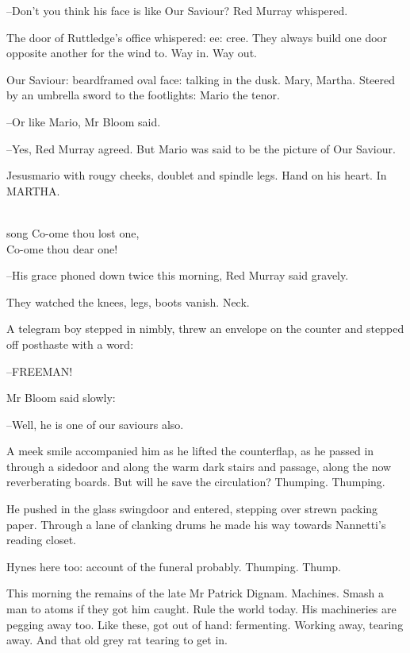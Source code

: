--Don't you think his face is like Our Saviour?
Red Murray whispered.

The door of Ruttledge's office whispered: ee: cree.
They always build one door opposite another for the wind to.
Way in.
Way out.

Our Saviour:
beardframed oval face:
talking in the dusk.
Mary, Martha.
Steered by an umbrella sword to the footlights:
Mario the tenor.

--Or like Mario,
Mr Bloom said.

--Yes,
Red Murray agreed.
But Mario was said to be the picture of Our Saviour.

Jesusmario with rougy cheeks, doublet and spindle legs.
Hand on his heart.
In MARTHA.


\\song{%
    Co-ome thou lost one,\\
    Co-ome thou dear one!}



--His grace phoned down twice this morning,
Red Murray said gravely.

They watched the knees, legs, boots vanish.
Neck.

A telegram boy stepped in nimbly,
threw an envelope on the counter
and stepped off posthaste with a word:

--FREEMAN!

Mr Bloom said slowly:

--Well, he is one of our saviours also.

A meek smile accompanied him
as he lifted the counterflap,
as he passed in through a sidedoor
and along the warm dark stairs and passage,
along the now reverberating boards.
But will he save the circulation?
Thumping.
Thumping.

He pushed in the glass swingdoor and entered,
stepping over strewn packing paper.
Through a lane of clanking drums
he made his way towards Nannetti's reading closet.

Hynes here too:
account of the funeral probably.
Thumping.
Thump.



This morning the remains of the late Mr Patrick Dignam.
Machines.
Smash a man to atoms if they got him caught.
Rule the world today.
His machineries are pegging away too.
Like these, got out of hand:
fermenting.
Working away, tearing away.
And that old grey rat tearing to get in.



